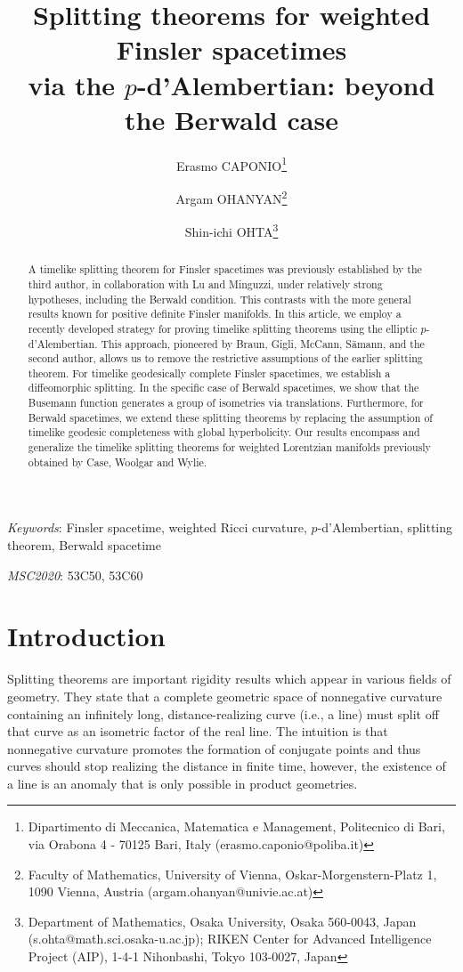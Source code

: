 \documentclass[a4paper,11pt]{article}
\title{Splitting theorems for weighted Finsler spacetimes\\ via the $p$-d'Alembertian: beyond the Berwald case}
\author{Erasmo CAPONIO\thanks{
Dipartimento di Meccanica, Matematica e Management,
Politecnico di Bari, via Orabona 4 - 70125 Bari, Italy
(\textsf{erasmo.caponio@poliba.it})}
\and
Argam OHANYAN\thanks{
Faculty of Mathematics, University of Vienna,
Oskar-Morgenstern-Platz 1, 1090 Vienna, Austria
(\textsf{argam.ohanyan@univie.ac.at})}
\and
Shin-ichi OHTA\thanks{
Department of Mathematics, Osaka University, Osaka 560-0043, Japan
(\textsf{s.ohta@math.sci.osaka-u.ac.jp});
RIKEN Center for Advanced Intelligence Project (AIP),
1-4-1 Nihonbashi, Tokyo 103-0027, Japan}}
\numberwithin{equation}{section}
\theoremstyle{definition}
\theoremstyle{plain}
\begin{document}
\maketitle

\begin{abstract}
	A timelike splitting theorem for Finsler spacetimes was previously established by the third author, in collaboration with Lu and Minguzzi, under relatively strong hypotheses, including the Berwald condition. This contrasts with the more general results known for positive definite Finsler manifolds.
	In this article, we employ a recently developed strategy for proving timelike splitting theorems using the elliptic $p$-d'Alembertian. This approach, pioneered by Braun, Gigli, McCann, Sämann, and the second author, allows us to remove the restrictive assumptions of the earlier splitting theorem.
		For timelike geodesically complete Finsler spacetimes, we establish a diffeomorphic splitting. In the specific case of Berwald spacetimes, we show that the Busemann function generates a group of isometries via translations. Furthermore, for Berwald spacetimes, we extend these splitting theorems by replacing the assumption of timelike geodesic completeness with global hyperbolicity.
		Our results encompass and generalize the timelike splitting theorems for weighted Lorentzian manifolds previously obtained by Case, Woolgar and Wylie.
\end{abstract}         
\vspace{1em}

\noindent
\emph{Keywords}: Finsler spacetime, weighted Ricci curvature, $p$-d'Alembertian, splitting theorem, Berwald spacetime
\medskip

\noindent
\emph{MSC2020}: 53C50, 53C60
\tableofcontents

\section{Introduction}\label{sc:intro}

Splitting theorems are important rigidity results which appear in various fields of geometry. They state that a complete geometric space of nonnegative curvature containing an infinitely long, distance-realizing curve (i.e., a line) must split off that curve as an isometric factor of the real line. The intuition is that nonnegative curvature promotes the formation of conjugate points and thus curves should stop realizing the distance in finite time, however, the existence of a line is an anomaly that is only possible in product geometries.
\end{document}
